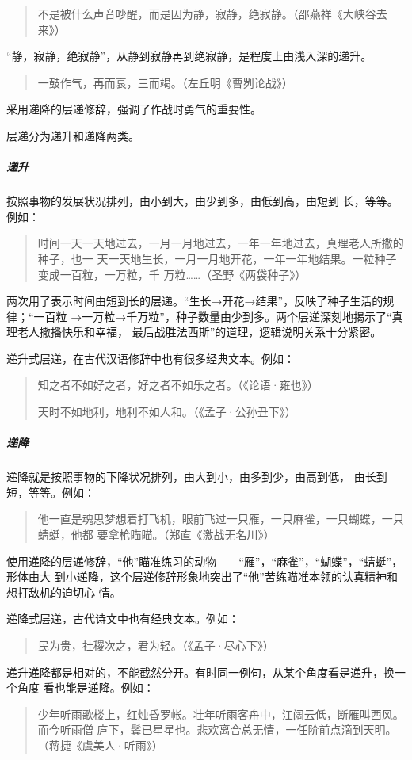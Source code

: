 \documentclass[final,oneside]{ctexbook}
\newenvironment{equotation}{\begin{quotation}\kaishu}{\end{quotation}}
\begin{document}
\begin{equotation}
  不是被什么声音吵醒，而是因为静，寂静，绝寂静。（邵燕祥《大峡谷去来》）
\end{equotation}
“静，寂静，绝寂静”，从静到寂静再到绝寂静，是程度上由浅入深的递升。

\begin{equotation}
  一鼓作气，再而衰，三而竭。（左丘明《曹刿论战》）
\end{equotation}
采用递降的层递修辞，强调了作战时勇气的重要性。

层递分为递升和递降两类。

\subparagraph{递升}按照事物的发展状况排列，由小到大，由少到多，由低到高，由短到
长，等等。例如：

\begin{equotation}
  时间一天一天地过去，一月一月地过去，一年一年地过去，真理老人所撒的种子，也一
  天一天地生长，一月一月地开花，一年一年地结果。一粒种子变成一百粒，一万粒，千
  万粒……（圣野《两袋种子》）
\end{equotation}
两次用了表示时间由短到长的层递。“生长→开花→结果”，反映了种子生活的规律；“一百粒
→一万粒→千万粒”，种子数量由少到多。两个层递深刻地揭示了“真理老人撒播快乐和幸福，
最后战胜法西斯”的道理，逻辑说明关系十分紧密。

递升式层递，在古代汉语修辞中也有很多经典文本。例如：
\begin{equotation}
  知之者不如好之者，好之者不如乐之者。（《论语·雍也》）

  天时不如地利，地利不如人和。（《孟子·公孙丑下》）
\end{equotation}

\subparagraph{递降}递降就是按照事物的下降状况排列，由大到小，由多到少，由高到低，
由长到短，等等。例如：
\begin{equotation}
  他一直是魂思梦想着打飞机，眼前飞过一只雁，一只麻雀，一只蝴蝶，一只蜻蜓，他都
  要拿枪瞄瞄。（郑直《激战无名川》）
\end{equotation}

使用递降的层递修辞，“他”瞄准练习的动物——“雁”，“麻雀”，“蝴蝶”，“蜻蜓”，形体由大
到小递降，这个层递修辞形象地突出了“他”苦练瞄准本领的认真精神和想打敌机的迫切心
情。

递降式层递，古代诗文中也有经典文本。例如：
\begin{equotation}
  民为贵，社稷次之，君为轻。（《孟子·尽心下》）
\end{equotation}

递升递降都是相对的，不能截然分开。有时同一例句，从某个角度看是递升，换一个角度
看也能是递降。例如：
\begin{equotation}
  少年听雨歌楼上，红烛昏罗帐。壮年听雨客舟中，江阔云低，断雁叫西风。而今听雨僧
  庐下，鬓已星星也。悲欢离合总无情，一任阶前点滴到天明。（蒋捷《虞美人·听雨》）
\end{equotation}
\end{document}
